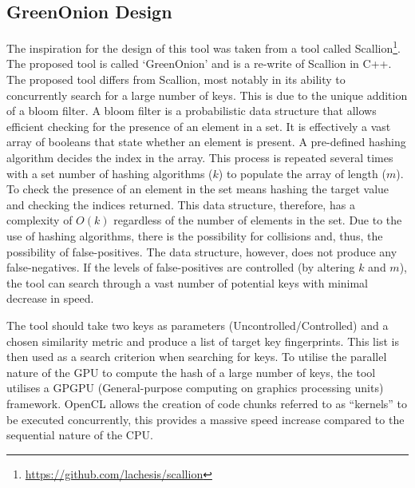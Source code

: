 \subsection{GreenOnion Design}

The inspiration for the design of this tool was taken from a tool called Scallion\footnote{\url{https://github.com/lachesis/scallion}}. The proposed tool is called `GreenOnion' and is a re-write of Scallion in C++.  The proposed tool differs from Scallion, most notably in its ability to concurrently search for a large number of keys. This is due to the unique addition of a bloom filter. A bloom filter is a probabilistic data structure that allows efficient checking for the presence of an element in a set. It is effectively a vast array of booleans that state whether an element is present. A pre-defined hashing algorithm decides the index in the array. This process is repeated several times with a set number of hashing algorithms ($k$) to populate the array of length ($m$). To check the presence of an element in the set means hashing the target value and checking the indices returned. This data structure, therefore, has a complexity of $O(k)$ regardless of the number of elements in the set. Due to the use of hashing algorithms, there is the possibility for collisions and, thus, the possibility of false-positives. The data structure, however, does not produce any false-negatives. If the levels of false-positives are controlled (by altering $k$ and $m$), the tool can search through a vast number of potential keys with minimal decrease in speed.

The tool should take two keys as parameters (Uncontrolled/Controlled) and a chosen similarity metric and produce a list of target key fingerprints. This list is then used as a search criterion when searching for keys. To utilise the parallel nature of the GPU to compute the hash of a large number of keys, the tool utilises a GPGPU (General-purpose computing on graphics processing units) framework. OpenCL allows the creation of code chunks referred to as ``kernels'' to be executed concurrently, this provides a massive speed increase compared to the sequential nature of the CPU.